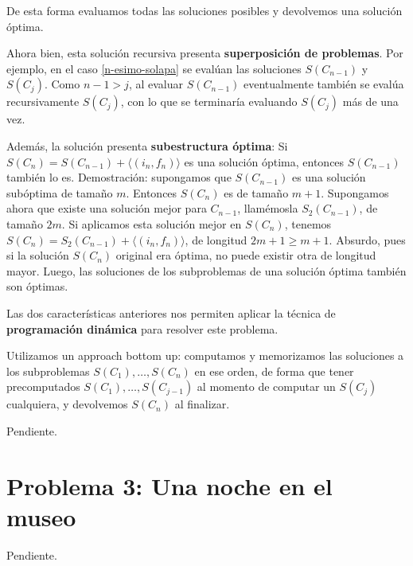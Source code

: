 \documentclass[a4paper,10pt,twoside]{article}
\newenvironment{pseudo}[1][]{%
    \vspace{0.5em}%
    \begin{algorithmic}%
}
{%
    \end{algorithmic}%
    \vspace{0.5em}%
}
\begin{document}
De esta forma evaluamos todas las soluciones posibles y devolvemos una solución óptima.

Ahora bien, esta solución recursiva presenta \textbf{superposición de problemas}. Por ejemplo, en el caso \ref{n-esimo-solapa} se evalúan las soluciones $S(C_{n-1})$ y $S(C_j)$. Como $n - 1 > j$, al evaluar $S(C_{n-1})$ eventualmente también se evalúa recursivamente $S(C_j)$, con lo que se terminaría evaluando $S(C_j)$ más de una vez.

Además, la solución presenta \textbf{subestructura óptima}: Si $S(C_n) = S(C_{n-1}) + \langle (i_n, f_n) \rangle$ es una solución óptima, entonces $S(C_{n-1})$ también lo es. Demostración: supongamos que $S(C_{n-1})$ es una solución subóptima de tamaño $m$. Entonces $S(C_n)$ es de tamaño $m + 1$. Supongamos ahora que existe una solución mejor para $C_{n-1}$, llamémosla $S_2(C_{n-1})$, de tamaño $2m$. Si aplicamos esta solución mejor en $S(C_n)$, tenemos $S(C_n) = S_2(C_{n-1}) + \langle (i_n, f_n) \rangle$, de longitud $2m + 1 \geq m + 1$. Absurdo, pues si la solución $S(C_n)$ original era óptima, no puede existir otra de longitud mayor. Luego, las soluciones de los subproblemas de una solución óptima también son óptimas.

Las dos características anteriores nos permiten aplicar la técnica de \textbf{programación dinámica} para resolver este problema.

Utilizamos un approach bottom up: computamos y memorizamos las soluciones a los subproblemas $S(C_1), \ldots, S(C_n)$ en ese orden, de forma que tener precomputados $S(C_1), \ldots, S(C_{j-1})$ al momento de computar un $S(C_j)$ cualquiera, y devolvemos $S(C_n)$ al finalizar.

\begin{pseudo}
        \State Pendiente.
    \EndProcedure 
\end{pseudo}




\section{Problema 3: Una noche en el museo}

Pendiente.
\end{document}
